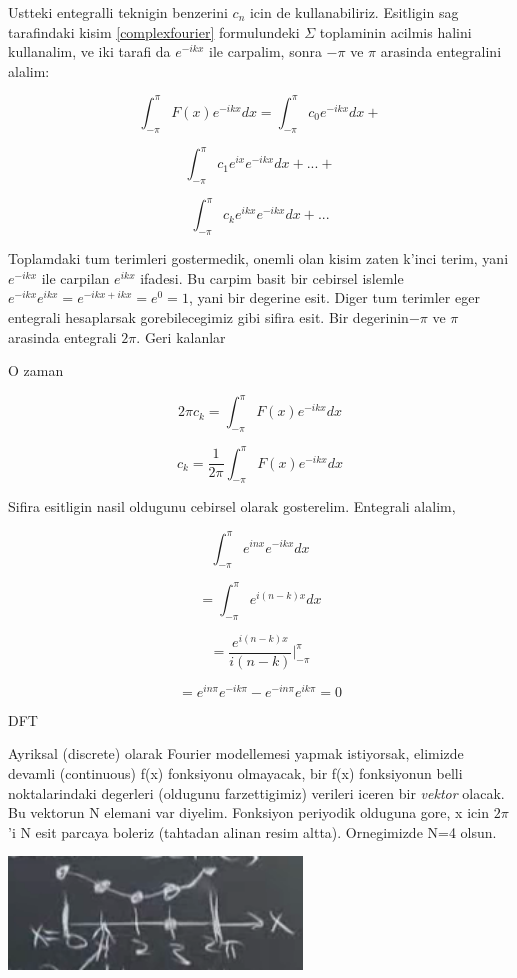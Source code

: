 \documentclass[12pt,fleqn]{article}
\begin{document}
Ustteki entegralli teknigin benzerini $c_n$ icin de kullanabiliriz. Esitligin
sag tarafindaki kisim \ref{complexfourier} formulundeki $\Sigma$ toplaminin
acilmis halini kullanalim, ve iki tarafi da $e^{-ikx}$ ile carpalim, sonra
$-\pi$ ve $\pi$ arasinda entegralini alalim:

\[ \int_{-\pi}^{\pi}F(x)e^{-ikx}dx = \int_{-\pi}^{\pi}c_0e^{-ikx}dx + \]

\[ \int_{-\pi}^{\pi}c_1e^{ix}e^{-ikx}dx + ... +  \]

\[ \int_{-\pi}^{\pi}c_ke^{ikx}e^{-ikx}dx + ... \]

Toplamdaki tum terimleri gostermedik, onemli olan kisim zaten k'inci terim, yani
$e^{-ikx}$ ile carpilan $e^{ikx}$ ifadesi. Bu carpim basit bir cebirsel islemle
$e^{-ikx}e^{ikx} = e^{-ikx + ikx} = e^{0} = 1$, yani bir degerine esit. Diger
tum terimler eger entegrali hesaplarsak gorebilecegimiz gibi sifira esit. Bir
degerinin$-\pi$ ve $\pi$ arasinda entegrali $2\pi$. Geri kalanlar

O zaman

\[ 2\pi c_k = \int_{-\pi}^{\pi}F(x)e^{-ikx}dx \]

\[ c_k = \frac{1}{2\pi}\int_{-\pi}^{\pi}F(x)e^{-ikx}dx \]

Sifira esitligin nasil oldugunu cebirsel olarak gosterelim. Entegrali alalim,

\[ \int_{-\pi}^{\pi}e^{inx}e^{-ikx}dx \]

\[ = \int_{-\pi}^{\pi}e^{i(n-k)x}dx \]

\[ = \frac{e^{i(n-k)x}}{i(n-k)} \bigg|_{-\pi}^{\pi}  \]

\[ = e^{in\pi}e^{-ik\pi} - e^{-in\pi}e^{ik\pi} = 0 \]

DFT

Ayriksal (discrete) olarak Fourier modellemesi yapmak istiyorsak, elimizde
devamli (continuous) f(x) fonksiyonu olmayacak, bir f(x) fonksiyonun belli
noktalarindaki degerleri (oldugunu farzettigimiz) verileri iceren bir {\em
  vektor} olacak. Bu vektorun N elemani var diyelim. Fonksiyon periyodik
olduguna gore, x icin $2\pi$'i N esit parcaya boleriz (tahtadan alinan resim
altta). Ornegimizde N=4 olsun.

\includegraphics[height=3cm]{fourier-fn.png}
\end{document}
